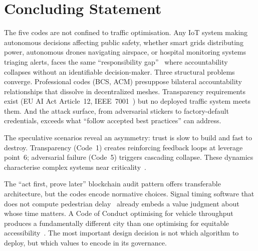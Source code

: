 \documentclass[sigconf,nonacm]{acmart}
\begin{document}
\section*{Concluding Statement}

The five codes are not confined to traffic optimisation. Any IoT system making autonomous decisions affecting public safety, whether smart grids distributing power, autonomous drones navigating airspace, or hospital monitoring systems triaging alerts, faces the same ``responsibility gap''~\cite{matthias2004} where accountability collapses without an identifiable decision-maker. Three structural problems converge. Professional codes (BCS, ACM) presuppose bilateral accountability relationships that dissolve in decentralized meshes. Transparency requirements exist (EU AI Act Article~12, IEEE~7001~\cite{winfield2022ieee}) but no deployed traffic system meets them. And the attack surface, from adversarial stickers to factory-default credentials, exceeds what ``follow accepted best practices'' can address.

The speculative scenarios reveal an asymmetry: trust is slow to build and fast to destroy. Transparency (Code~1) creates reinforcing feedback loops at leverage point~6; adversarial failure (Code~5) triggers cascading collapse. These dynamics characterise complex systems near criticality~\cite{witthaut2022}.

The ``act first, prove later'' blockchain audit pattern offers transferable architecture, but the codes encode normative choices. Signal timing software that does not compute pedestrian delay~\cite{nchrp969} already embeds a value judgment about whose time matters. A Code of Conduct optimising for vehicle throughput produces a fundamentally different city than one optimising for equitable accessibility~\cite{martens2016}. The most important design decision is not which algorithm to deploy, but which values to encode in its governance.
\end{document}
